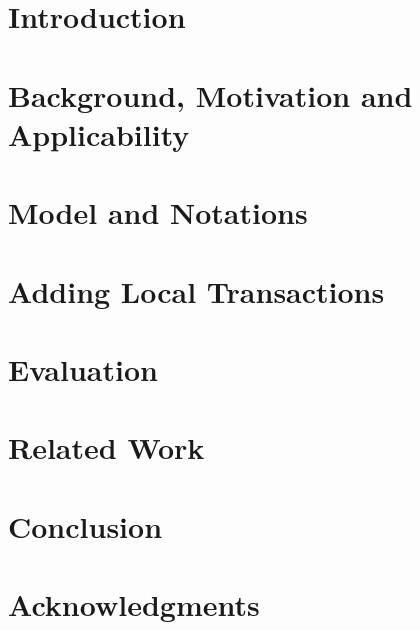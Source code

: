 \documentclass{vldb}
\newcommand\MyIncludeGraphics[2][]{%
    \IfFileExists{#2}{%
        \texttt{[image: \#2]}%
    }{%
        \missingfigure[figwidth=2.0cm]{}%
    }%
}%
\begin{document}
\maketitle

\sloppy


\begin{abstract}

\end{abstract}


\section{Introduction} \label{sec:intro}

\section{Background, Motivation and Applicability}%
\label{sec:background}

\section{Model and Notations}

\section{Adding Local Transactions}

\section{Evaluation}

\section{Related Work}


\section{Conclusion}

\ifblind
\else
\section{Acknowledgments}
\end{document}
